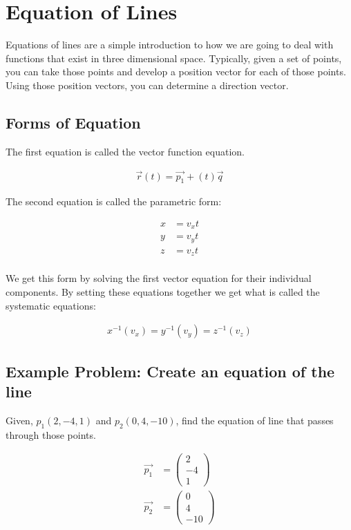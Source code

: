 \section{Equation of Lines}
Equations of lines are a simple introduction to how we are going to deal with functions that exist in three dimensional space. Typically, given 
a set of points, you can take those points and develop a position vector for each of those points. Using those position vectors, you can determine 
a direction vector. 

\subsection{Forms of Equation}
The first equation is called the vector function equation. 

\begin{align*}
	\vec{r}(t) = \vec{p_1} + (t)\vec{q}
\end{align*}

The second equation is called the parametric form: 

\begin{align*}
	x &= v_x t \\ 
	y &= v_y t \\ 
	z &= v_z t \\
\end{align*}

We get this form by solving the first vector equation for their individual components. 
By setting these equations together we get what is called the systematic equations:

\begin{align*}
	x^{-1}(v_x) = y^{-1}(v_y) = z^{-1}(v_z)
\end{align*}

\subsection{Example Problem: Create an equation of the line}
Given, $p_1(2,-4,1)$ and $p_2(0,4,-10)$, find the equation of line that passes through those points. 

\begin{align*}
	\vec{p_1} &= \begin{pmatrix} 
					2 \\ -4 \\ 1
				\end{pmatrix} \\ 
	\vec{p_2} &= \begin{pmatrix} 
					0 \\ 4 \\ -10
				\end{pmatrix}
\end{align*}

